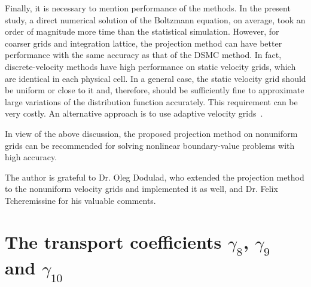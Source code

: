 \documentclass[final]{jfm} %
\begin{document}
Finally, it is necessary to mention performance of the methods.
In the present study, a direct numerical solution of the Boltzmann equation, on average,
took an order of magnitude more time than the statistical simulation.
However, for coarser grids and integration lattice, the projection method can
have better performance with the same accuracy as that of the DSMC method.
In fact, discrete-velocity methods have high performance on static velocity grids,
which are identical in each physical cell.
In a general case, the static velocity grid should be uniform or close to it and, therefore,
should be sufficiently fine to approximate large variations of the distribution function accurately.
This requirement can be very costly. An alternative approach is to use adaptive velocity grids~\citep{Kolobov2013}.

In view of the above discussion, the proposed projection method on nonuniform grids can be recommended
for solving nonlinear boundary-value problems with high accuracy.

\begin{acknowledgments}
    The author is grateful to Dr. Oleg Dodulad, who extended the projection method
    to the nonuniform velocity grids and implemented it as well,
    and Dr. Felix Tcheremissine for his valuable comments.
\end{acknowledgments}

\appendix
\section{The transport coefficients \(\gamma_8\), \(\gamma_9\) and \(\gamma_{10}\)}
\label{sec:gamma_coeffs}
\end{document}
